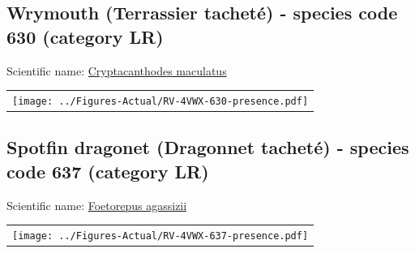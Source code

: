 \documentclass[12pt]{article}\usepackage[]{graphicx}\usepackage[]{color}
\begin{document}
\setcounter{figure}{0}

\hypertarget{sec:630}{%
\subsection{Wrymouth (Terrassier tacheté) - species code 630 (category LR)}\label{sec:630}}

  


Scientific name: \href{http://www.marinespecies.org/aphia.php?p=taxdetails\&id=159675}{Cryptacanthodes maculatus} \newline
\begin{minipage}{1.0\textwidth}
 \begin{tabular}{c}
\texttt{[image: ../Figures-Actual/RV-4VWX-630-presence.pdf]} \\ 
\end{tabular} 
\end{minipage}
\clearpage

\renewcommand\thefigure{\thesubsection\Alph{figure}}

\setcounter{figure}{0}

\hypertarget{sec:637}{%
\subsection{Spotfin dragonet (Dragonnet tacheté) - species code 637 (category LR)}\label{sec:637}}

  


Scientific name: \href{http://www.marinespecies.org/aphia.php?p=taxdetails\&id=276339}{Foetorepus agassizii} \newline
\begin{minipage}{1.0\textwidth}
 \begin{tabular}{c}
\texttt{[image: ../Figures-Actual/RV-4VWX-637-presence.pdf]} \\ 
\end{tabular} 
\end{minipage}
\clearpage

\renewcommand\thefigure{\thesubsection\Alph{figure}}
\end{document}
